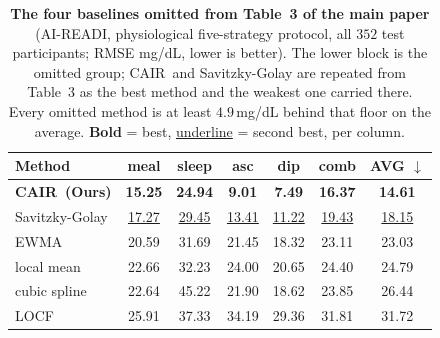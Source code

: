 \begin{table}[t]
  \centering
  {\small
  \setlength{\tabcolsep}{3.2pt}
  \begin{tabular}{lcccccc}
    \toprule
    Method & meal & sleep & asc & dip & comb & \textbf{AVG} $\downarrow$ \\
    \midrule
    \textbf{CAIR\ (Ours)} & \textbf{15.25} & \textbf{24.94} & \textbf{9.01} & \textbf{7.49} & \textbf{16.37} & \textbf{14.61} \\
    Savitzky-Golay & \underline{17.27} & \underline{29.45} & \underline{13.41} & \underline{11.22} & \underline{19.43} & \underline{18.15} \\
    \midrule
    EWMA          & 20.59 & 31.69 & 21.45 & 18.32 & 23.11 & 23.03 \\
    local mean    & 22.66 & 32.23 & 24.00 & 20.65 & 24.40 & 24.79 \\
    cubic spline  & 22.64 & 45.22 & 21.90 & 18.62 & 23.85 & 26.44 \\
    LOCF          & 25.91 & 37.33 & 34.19 & 29.36 & 31.81 & 31.72 \\
    \bottomrule
  \end{tabular}}
  \caption{\textbf{The four baselines omitted from Table~3 of the main
  paper} (AI-READI, physiological five-strategy protocol, all $352$ test
  participants; RMSE mg/dL, lower is better). The lower block is the omitted
  group; CAIR\ and Savitzky-Golay are repeated from Table~3 as the best method
  and the weakest one carried there. Every omitted method is at least
  $4.9$\,mg/dL behind that floor on the average. \textbf{Bold} = best,
  \underline{underline} = second best, per column.}
  \label{tab:phys-rest}
\end{table}

